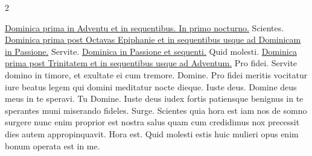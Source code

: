 \newpage


\thispagestyle{fancy}

\begin{multicols*}{2}


\noindent \ul{Dominica prima in Adventu et in sequentibus. In primo nocturno.}
 Scientes.
\newline \ul{Dominica prima post Octavas Epiphanie et in sequentibus usque ad Dominicam in Passione.}
 Servite.
\newline \ul{Dominica in Passione et sequenti.}
 Quid molesti.
\newline \ul{Dominica prima post Trinitatem et in sequentibus usque ad Adventum.}
 Pro fidei.
 Servite domino in timore, et exultate ei cum tremore.
 Domine.
 Pro fidei meritis vocitatur iure beatus legem qui domini meditatur nocte dieque.
 Iuste deus.
 Domine deus meus in te speravi.
 Tu Domine.
 Iuste deus iudex fortis patiensque benignus in te sperantes muni miserando fideles.
 Surge.
 Scientes quia hora est iam nos de somno surgere nunc enim proprior est nostra salus quam cum credidimus nox precessit dies autem appropinquavit.
 Hora est.
 Quid molesti estis huic mulieri opus enim bonum operata est in me.

\end{multicols*}
